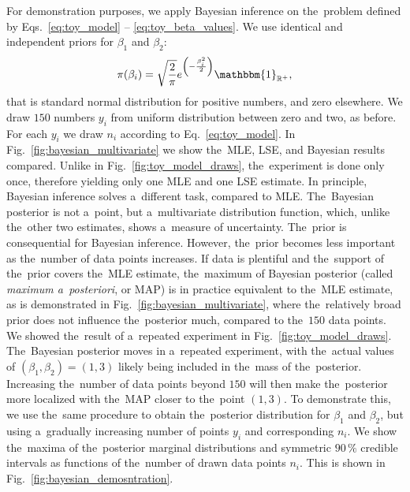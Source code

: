 For demonstration purposes, we apply Bayesian inference on the~problem defined by Eqs.~\ref{eq:toy_model} -- \ref{eq:toy_beta_values}. We use identical and independent priors for $\beta_1$ and $\beta_2$:
\begin{equation}
    \pi(\beta_i) = \sqrt{\frac{2}{\pi}} e^{\left(-\frac{\beta_i^2}{2}\right)} \mathbbm{1}_{\mathbb{R}^+} ,
\end{equation}
that is standard normal distribution for positive numbers, and zero elsewhere. We draw $150$ numbers $y_i$ from uniform distribution between zero and two, as before. For each $y_i$ we draw $n_i$ according to Eq.~\ref{eq:toy_model}. In Fig.~\ref{fig:bayesian_multivariate} we show the~MLE, LSE, and Bayesian results compared. Unlike in Fig.~\ref{fig:toy_model_draws}, the~experiment is done only once, therefore yielding only one MLE and one LSE estimate. In principle, Bayesian inference solves a~different task, compared to MLE. The~Bayesian posterior is not a~point, but a~multivariate distribution function, which, unlike the~other two estimates, shows a~measure of uncertainty. The~prior is consequential for Bayesian inference. However, the~prior becomes less important as the~number of data points increases. If data is plentiful and the~support of the~prior covers the~MLE estimate, the~maximum of Bayesian posterior (called \textit{maximum a~posteriori}, or MAP) is in practice equivalent to the~MLE estimate, as is demonstrated in Fig.~\ref{fig:bayesian_multivariate}, where the~relatively broad prior does not influence the~posterior much, compared to the~$150$ data points. We showed the~result of a~repeated experiment in Fig.~\ref{fig:toy_model_draws}. The~Bayesian posterior moves in a~repeated experiment, with the~actual values of $(\beta_1,\beta_2) = (1,3)$ likely being included in the~mass of the~posterior. Increasing the~number of data points beyond $150$ will then make the~posterior more localized with the~MAP closer to the~point $(1,3)$. To demonstrate this, we use the~same procedure to obtain the~posterior distribution for $\beta_1$ and $\beta_2$, but using a~gradually increasing number of points $y_i$ and corresponding $n_i$. We show the~maxima of the~posterior marginal distributions and symmetric $90 \, \%$ credible intervals as functions of the~number of drawn data points $n_i$. This is shown in Fig.~\ref{fig:bayesian_demosntration}.

